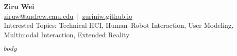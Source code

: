 \documentclass[a4paper,9pt]{extarticle}
\begin{document}
\pagestyle{empty}

    \begin{center}
        {\Huge\bfseries Ziru Wei}\\[6pt]
        {\large
          \href{mailto:ziruw@andrew.cmu.edu}{ziruw@andrew.cmu.edu} \,|\, 
          \href{https://zuriniw.github.io}{zuriniw.github.io}
        }\\[6pt]
        {\small {Interested Topics: Technical HCI, Human–Robot Interaction,   
        User Modeling, Multimodal Interaction, Extended Reality}}
    \end{center}
    \vspace{0.5em}
    
    

$body$
\end{document}
